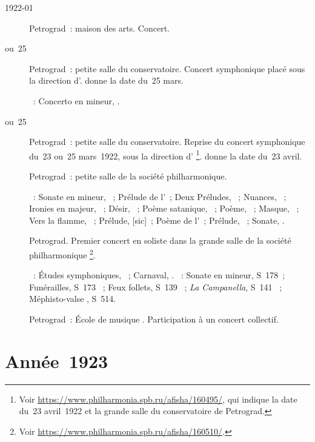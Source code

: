 \begin{description}
 \item[1922-01]
 Petrograd~: maison des arts.
 Concert.
 \item[ ou~25]
 Petrograd~: petite salle du conservatoire.
 Concert symphonique placé sous la direction d'\ECooper{}.
 \citet[p.~28]{Sofronitsky82a} donne la date du~25 mars.

 \textsc{\Scriabine{}}~: Concerto en \kF \Sharp mineur, .
 \item[ ou~25]
 Petrograd~: petite salle du conservatoire.
 Reprise du concert symphonique du~23 ou~25 mars~1922, sous la direction
 d'\ECooper{}%
 \footnote{Voir \href{https://www.philharmonia.spb.ru/afisha/160495/}%
 {https://www.philharmonia.spb.ru/afisha/160495/}, qui indique la date du~23
 avril~1922 et la grande salle du conservatoire de Petrograd.}.
 \citet[p.~28]{Sofronitsky82a} donne la date du~23 avril.
 \item[]
 Petrograd~: petite salle de la société philharmonique.

 \textsc{\Scriabine{}}~: Sonate en \kF \Sharp mineur, ~; Prélude de
 l'~; Deux Préludes, ~; Nuances,  ~;
 Ironies en \kC majeur,  ~; Désir,  ~;
 Poème satanique, ~; Poème,  ~; Masque,
  ~; Vers la flamme, ~; Prélude, 
 [sic]~; Poème de l'~; Prélude,  ~; Sonate,
 .
 \item[]
 Petrograd.
 Premier concert en soliste dans la grande salle de la société
 philharmonique%
 \footnote{Voir \href{https://www.philharmonia.spb.ru/afisha/160510/}%
 {https://www.philharmonia.spb.ru/afisha/160510/}.}.

 \textsc{\Schumann{}}~: Études symphoniques, ~; Carnaval, .
 \textsc{\Liszt{}}~: Sonate en \kB mineur, S~178~; Funérailles, S~173
 ~; Feux follets, S~139 ~; \emph{La Campanella}, S~141
 ~; Méphisto-valse , S~514.
 \item[]
 Petrograd~: École de musique \NRimskiKorsakov{}.
 Participation à un concert collectif.
\end{description}

\section{Année~1923}

